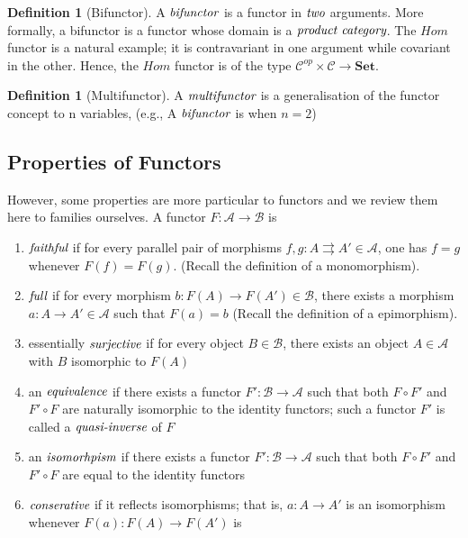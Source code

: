 \documentclass[10pt, oneside, reqno]{amsart}
\theoremstyle{plain}%
\theoremstyle{definition}
\newtheorem{defn}[thm]{Definition}
\theoremstyle{remark}
\begin{document}
\begin{defn}[Bifunctor]
 A $\emph{bifunctor}$ is a functor in $\emph{two}$ arguments. More formally, a bifunctor is a functor whose
 domain is a $\emph{product category}$.
 The $Hom$ functor is a natural example; it is contravariant in one argument while covariant in the other.
 Hence, the $Hom$ functor is of the type $\mathcal{C}^{op} \times \mathcal{C} \to \textbf{Set}$.
\end{defn}

\begin{defn}[Multifunctor]
 A $\emph{multifunctor}$ is a generalisation of the functor concept to n variables, (e.g., A $\emph{bifunctor}$ is when $n=2$)
\end{defn}

\subsection{Properties of Functors} %
\label{subsec:functorsproperties}
However, some properties are more particular to functors and we review them here to families ourselves.
A functor $F : \mathcal{A} \to \mathcal{B}$ is
\begin{enumerate}
 \item $\emph{faithful}$ if for every parallel pair of morphisms $f,g : A \rightrightarrows A' \in \mathcal{A}$, one has $f = g$ whenever $F(f) = F(g)$.
 (Recall the definition of a monomorphism).
 \item $\emph{full}$ if for every morphism $b: F(A) \to F(A') \in \mathcal{B}$, there exists a morphism $a: A \to A' \in \mathcal{A}$ such that $F(a) = b$
 (Recall the definition of a epimorphism).
 \item essentially $\emph{surjective}$ if for every object $B \in \mathcal{B}$, there exists an object $A \in \mathcal{A}$ with $B$ isomorphic to $F(A)$
 \item an $\emph{equivalence}$ if there exists a functor $F': \mathcal{B} \to \mathcal{A}$ such that both $F \circ F'$ and $F' \circ F$ are naturally
 isomorphic to the identity functors; such a functor $F'$ is called a $\emph{quasi-inverse}$ of $F$
 \item an $\emph{isomorhpism}$ if there exists a functor $F': \mathcal{B} \to \mathcal{A}$ such that both $F \circ F'$ and $F' \circ F$
 are equal to the identity functors
 \item $\emph{conserative}$ if it reflects isomorphisms; that is, $a: A \to A'$ is an isomorphism whenever $F(a): F(A) \to F(A')$ is
\end{enumerate}
\end{document}
